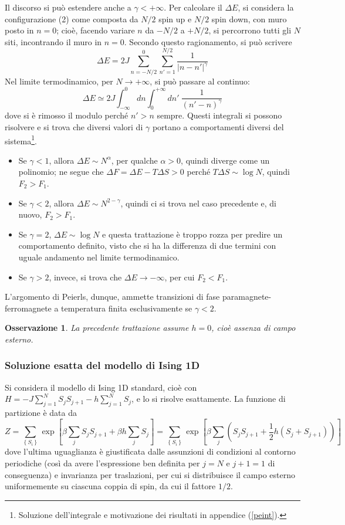 \documentclass[11pt, a4paper]{scrartcl}
\theoremstyle{style}
\newtheorem{osservazione}{Osservazione}[section]
\theoremstyle{style1}
\numberwithin{equation}{subsection}
\begin{document}
Il discorso si pu\`o estendere anche a $\gamma < +\infty$. 
Per calcolare il $\Delta E$, si considera la configurazione (2) come composta da $N / 2$ spin up e $N / 2$ spin down, con muro posto in $n=0$; cio\`e, facendo variare $n$ da $-N/2$ a $+ N / 2$, si percorrono tutti gli $N$ siti, incontrando il muro in $n=0$.
Secondo questo ragionamento, si pu\`o scrivere 
\[
\Delta E = 2J \sum_{n = - N / 2}^{0} \sum_{n' = 1}^{N / 2} \frac{1}{\lvert n-n' \rvert ^{\gamma}}
\] 
Nel limite termodinamico, per $N \to  + \infty$, si pu\`o passare al continuo:
\[
\Delta E \simeq 2 J \int_{-\infty} ^0 dn \int_{0} ^{+\infty}  dn' \ \frac{1}{(n'-n)^{\gamma}}
\] 
dove si \`e rimosso il modulo perch\'e $n'>n$ sempre.
Questi integrali si possono risolvere e si trova che diversi valori di $\gamma$ portano a comportamenti diversi del sistema\footnote{Soluzione dell'integrale e motivazione dei risultati in appendice (\ref{peint}).}.
\begin{itemize}
	\item Se $\gamma < 1$, allora $\Delta E \sim N^\alpha $, per qualche $\alpha >0 $, quindi diverge come un polinomio; ne segue che $\Delta F = \Delta E - T\Delta S > 0$ perch\'e $T \Delta S\sim \log N$, quindi $F_{2} > F_1$.
	\item Se $\gamma <2$, allora $\Delta E \sim N^{2- \gamma}$, quindi ci si trova nel caso precedente e, di nuovo, $F_2 > F_1$.
	\item Se $\gamma=2$, $\Delta E \sim \log N$ e questa trattazione \`e troppo rozza per predire un comportamento definito, visto che si ha la differenza di due termini con uguale andamento nel limite termodinamico.
	\item Se $\gamma > 2$, invece, si trova che $\Delta E \to - \infty$, per cui $F_2<F_1$.
\end{itemize}
L'argomento di Peierls, dunque, ammette transizioni di fase paramagnete-ferromagnete a temperatura finita esclusivamente se $\gamma<2$.
\begin{osservazione}
La precedente trattazione assume $h=0$, cio\`e assenza di campo esterno.
\end{osservazione}

\subsubsection{Soluzione esatta del modello di Ising 1D}
Si considera il modello di Ising 1D standard, cio\`e con $H = - J \sum_{j=1}^{N} S_j S_{j+1}  - h \sum_{j=1}^{N} S_j$, e lo si risolve esattamente.
La funzione di partizione \`e data da
\[
Z = \sum_{\left\{ S_i \right\} }^{} \exp \left[ \beta \sum_{j}^{} S_jS_{j+1} + \beta h \sum_{j}^{} S_j \right] = \sum_{\left\{ S_i \right\} }^{} \exp \left[ \beta \sum_{j}^{} \left(S_jS_{j+1} +\frac{1}{2}h \left(S_j + S_{j+1} \right) \right)  \right] 
\] 
dove l'ultima uguaglianza \`e giustificata dalle assunzioni di condizioni al contorno periodiche (cos\`i da avere l'espressione ben definita per $j=N$ e $j+1 = 1$ di conseguenza) e invarianza per traslazioni, per cui si distribuisce il campo esterno uniformemente su ciascuna coppia di spin, da cui il fattore $1 / 2$.
\end{document}
